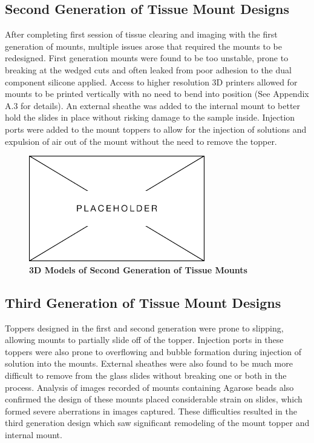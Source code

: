 \subsection{Second Generation of Tissue Mount Designs}

After completing first session of tissue clearing and imaging with the first generation of mounts, multiple issues arose that required the mounts to be redesigned. First generation mounts were found to be too unstable, prone to breaking at the wedged cuts and often leaked from poor adhesion to the dual component silicone applied. Access to higher resolution 3D printers allowed for mounts to be printed vertically with no need to bend into position (See Appendix A.3 for details). An external sheathe was added to the internal mount to better hold the slides in place without risking damage to the sample inside. Injection ports were added to the mount toppers to allow for the injection of solutions and expulsion of air out of the mount without the need to remove the topper. 

\begin{figure}[H]
        \centering
        \includegraphics[width=1\linewidth]{Figures/Placeholder.png}
        \caption{\textbf{3D Models of Second Generation of Tissue Mounts}}
        \label{fig:enter-label}
    \end{figure}
\subsection{Third Generation of Tissue Mount Designs}

Toppers designed in the first and second generation were prone to slipping, allowing mounts to partially slide off of the topper. Injection ports in these toppers were also prone to overflowing and bubble formation during injection of solution into the mounts. External sheathes were also found to be much more difficult to remove from the glass slides without breaking one or both in the process. Analysis of images recorded of mounts containing Agarose beads also confirmed the design of these mounts placed considerable strain on slides, which formed severe aberrations in images captured. These difficulties resulted in the third generation design which saw significant remodeling of the mount topper and internal mount. 

